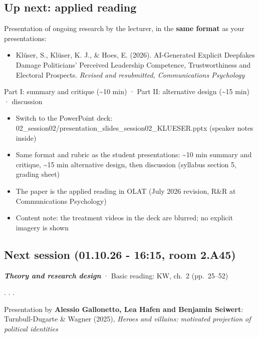 \documentclass[
  letterpaper,
  DIV=11,
  numbers=noendperiod]{scrartcl}
\providecommand{\tightlist}{%
  \setlength{\itemsep}{0pt}\setlength{\parskip}{0pt}}
\begin{document}
\subsection{Up next: applied reading}\label{up-next-applied-reading}

Presentation of ongoing research by the lecturer, in the \textbf{same
format} as your presentations:

\begin{itemize}
\tightlist
\item
  Klüser, S., Klüser, K. J., \& Hoes, E. (2026). AI-Generated Explicit
  Deepfakes Damage Politicians' Perceived Leadership Competence,
  Trustworthiness and Electoral Prospects. \emph{Revised and
  resubmitted, Communications Psychology}
\end{itemize}

Part I: summary and critique (\textasciitilde10 min) · Part II:
alternative design (\textasciitilde15 min) · discussion

\begin{itemize}
\tightlist
\item
  Switch to the PowerPoint deck:
  02\_session02/presentation\_slides\_session02\_KLUESER.pptx (speaker
  notes inside)
\item
  Same format and rubric as the student presentations: \textasciitilde10
  min summary and critique, \textasciitilde15 min alternative design,
  then discussion (syllabus section 5, grading sheet)
\item
  The paper is the applied reading in OLAT (July 2026 revision, R\&R at
  Communications Psychology)
\item
  Content note: the treatment videos in the deck are blurred; no
  explicit imagery is shown
\end{itemize}

\subsection{Next session (01.10.26 - 16:15, room
2.A45)}\label{next-session-01.10.26---1615-room-2.a45}

\textbf{\emph{Theory and research design}} · Basic reading: KW, ch.~2
(pp.~25--52)

. . .

Presentation by \textbf{Alessio Gallonetto, Lea Hafen and Benjamin
Seiwert}:\\
Turnbull-Dugarte \& Wagner (2025), \emph{Heroes and villains: motivated
projection of political identities}
\end{document}
